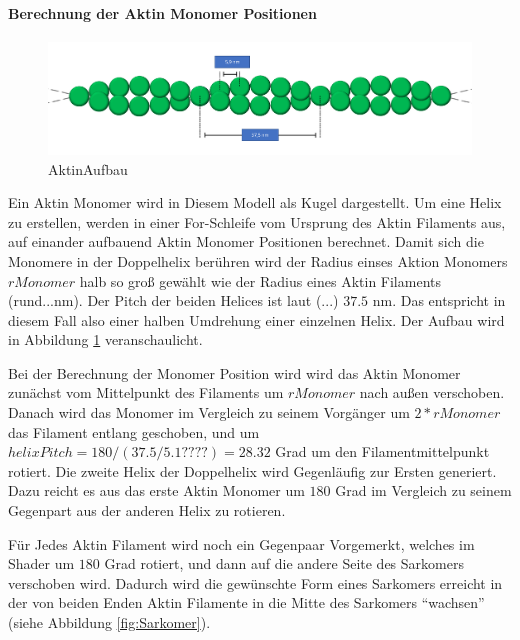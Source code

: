 \documentclass[a4paper,m]{cgBA}
\begin{document}
\paragraph{Berechnung der Aktin Monomer Positionen}

\begin{figure}[h]
\center
\includegraphics[width=1\textwidth]{Graphics/AktinAufbau2.pdf}
\caption{AktinAufbau}
\label{fig:AktinAufbau}
\end{figure}

Ein Aktin Monomer wird in Diesem Modell als Kugel dargestellt. Um eine Helix zu erstellen, werden in einer For-Schleife vom Ursprung des Aktin Filaments aus, auf einander aufbauend Aktin Monomer Positionen berechnet. Damit sich die Monomere in der Doppelhelix berühren wird der Radius einses Aktion Monomers \(rMonomer\) halb so groß gewählt wie der Radius eines Aktin Filaments (rund...nm). Der Pitch der beiden Helices ist laut (...) \(37.5\) nm. Das entspricht in diesem Fall also einer halben Umdrehung einer einzelnen Helix. Der Aufbau wird in Abbildung \ref{fig:AktinAufbau} veranschaulicht.

Bei der Berechnung der Monomer Position wird wird das Aktin Monomer zunächst vom Mittelpunkt des Filaments um \(rMonomer\) nach außen verschoben. Danach wird das Monomer im Vergleich zu seinem Vorgänger um \(2*rMonomer\) das Filament entlang geschoben, und um \(helixPitch = 180 / (37.5 / 5.1????) = 28.32\) Grad um den Filamentmittelpunkt rotiert. Die zweite Helix der Doppelhelix wird  Gegenläufig zur Ersten generiert. Dazu reicht es aus das erste Aktin Monomer um \(180\) Grad im Vergleich zu seinem Gegenpart aus der anderen Helix zu rotieren.

Für Jedes Aktin Filament wird noch ein Gegenpaar Vorgemerkt, welches im Shader um \(180\) Grad rotiert, und dann auf die andere Seite des Sarkomers verschoben wird. Dadurch wird die gewünschte Form eines Sarkomers erreicht in der von beiden Enden Aktin Filamente in die Mitte des Sarkomers ``wachsen'' (siehe Abbildung \ref{fig:Sarkomer}).
\end{document}
